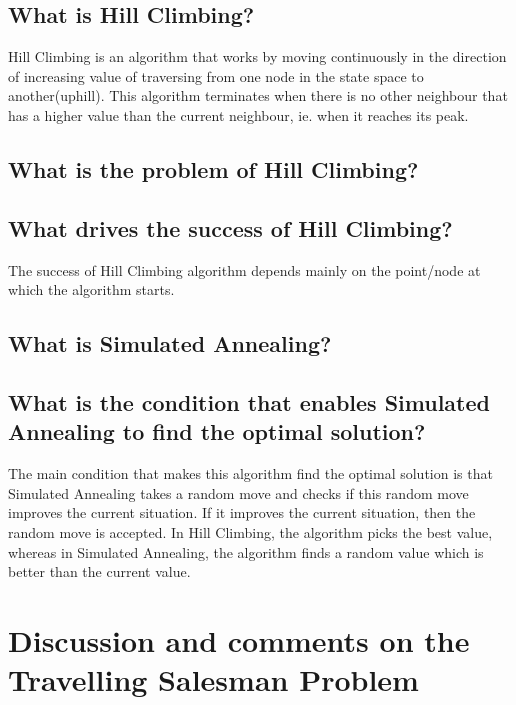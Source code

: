 \documentclass[11pt]{article}
\begin{document}
\subsection{What is Hill Climbing?}
Hill Climbing is an algorithm that works by moving continuously in the direction of increasing value of traversing from one node in the state space to another(uphill). This algorithm terminates when there is no other neighbour that has a higher value than the current neighbour, ie. when it reaches its peak.

\subsection{What is the problem of Hill Climbing?}
\subsection{What drives the success of Hill Climbing?}
The success of Hill Climbing algorithm depends mainly on the point/node at which the algorithm starts.

\subsection{What is Simulated Annealing?}
\subsection{What is the condition that enables Simulated Annealing to find
the optimal solution?}
The main condition that makes this algorithm find the optimal solution is that Simulated Annealing takes a random move and checks if this random move improves the current situation. If it improves the current situation, then the random move is accepted. In Hill Climbing, the algorithm picks the best value, whereas in Simulated Annealing, the algorithm finds a random value which is better than the current value. 

\newpage
\section{Discussion and comments on the Travelling Salesman Problem}
\end{document}
